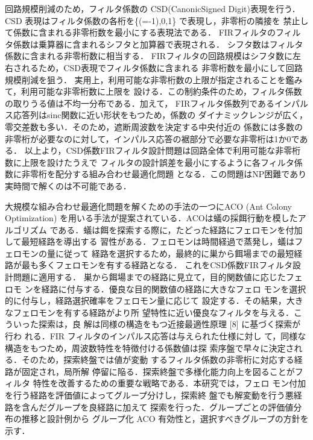 \documentclass[dvipdfmx,9pt]{ieej}
\begin{document}
回路規模削減のため，フィルタ係数の CSD(CanonicSigned Digit)表現を行う．
CSD 表現はフィルタ係数の各桁を\{(=-1),0,1\} で表現し，非零桁の隣接を
禁止して係数に含まれる非零桁数を最小にする表現法である．
FIRフィルタのフィルタ係数は乗算器に含まれるシフタと加算器で表現される．
シフタ数はフィルタ係数に含まれる非零桁数に相当する．
FIRフィルタの回路規模はシフタ数に左右されるため，CSD表現でフィルタ係数に含まれる
非零桁数を最小にして回路規模削減を狙う．
実用上，利用可能な非零桁数の上限が指定されることを鑑みて，利用可能な非零桁数に上限を
設ける．この制約条件のため，フィルタ係数の取りうる値は不均一分布である．加えて，
FIRフィルタ係数列であるインパルス応答列はsinc関数に近い形状をもつため，係数の
ダイナミックレンジが広く，零交差数も多い．そのため，遮断周波数を決定する中央付近の
係数には多数の非零桁が必要なのに対して，インパルス応答の裾部分で必要な非零桁は1か0である．
以上より，CSD係数FIRフィルタ設計問題は回路全体で利用可能な非零桁数に上限を設けたうえで
フィルタの設計誤差を最小にするように各フィルタ係数に非零桁を配分する組み合わせ最適化問題
となる．この問題はNP困難であり実時間で解くのは不可能である．

大規模な組み合わせ最適化問題を解くための手法の一つにACO (Ant Colony
Optimization) を用いる手法が提案されている．ACOは蟻の採餌行動を模したアルゴリズム
である．蟻は餌を探索する際に，たどった経路にフェロモンを付加して最短経路を導出する
習性がある．フェロモンは時間経過で蒸発し，蟻はフェロモンの量に従って
経路を選択するため，最終的に巣から餌場までの最短経路が最も多くフェロモンを有する経路となる．
これをCSD係数FIRフィルタ設計問題に適用する．
巣から餌場までの経路に見立て，目的関数値に応じたフェロモ
ンを経路に付与する．優良な目的関数値の経路に大きなフェロ
モンを選択的に付与し，経路選択確率をフェロモン量に応じて
設定する．その結果，大きなフェロモンを有する経路がより所
望特性に近い優良なフィルタを与える．こういった探索は，良
解は同様の構造をもつ近接最適性原理 [8] に基づく探索が行わ
れる．FIR フィルタのインパルス応答は与えられた仕様に対し
て，同様な構造をもつため，周波数特性を特徴付ける係数値は探
索序盤で早々に決定される．そのため，探索終盤では値が変動
するフィルタ係数の非零桁に対応する経路が固定され，局所解
停留に陥る．探索終盤で多様化能力向上を図ることがフィルタ
特性を改善するための重要な戦略である．本研究では，フェロ
モン付加を行う経路を評価値によってグループ分けし，探索終
盤でも解変動を行う悪経路を含んだグループを良経路に加えて
探索を行った．グループごとの評価値分布の推移と設計例から
グループ化 ACO 有効性と，選択すべきグループの方針を示す．

\end{document}
